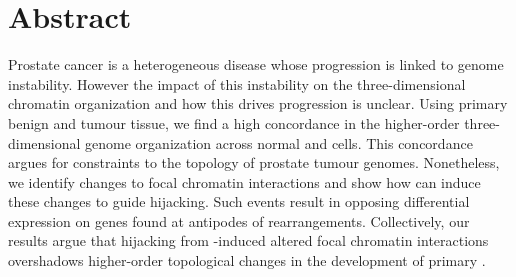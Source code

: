 \section{Abstract}

Prostate cancer is a heterogeneous disease whose progression is linked to genome instability.
However the impact of this instability on the three-dimensional chromatin organization and how this drives progression is unclear.
Using primary benign and tumour tissue, we find a high concordance in the higher-order three-dimensional genome organization across normal and  cells.
This concordance argues for constraints to the topology of prostate tumour genomes.
Nonetheless, we identify changes to focal chromatin interactions and show how  can induce these changes to guide  hijacking.
Such events result in opposing differential expression on genes found at antipodes of rearrangements.
Collectively, our results argue that  hijacking from -induced altered focal chromatin interactions overshadows higher-order topological changes in the development of primary .
